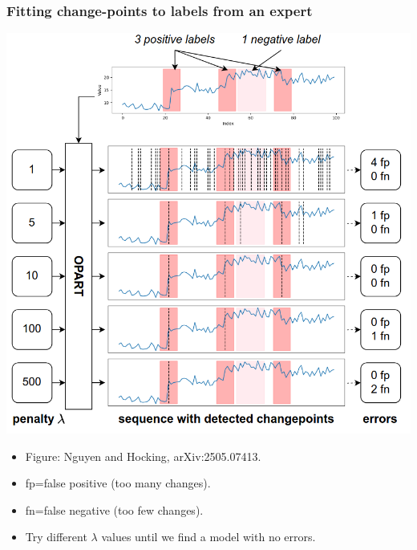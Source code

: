 \documentclass{beamer}
\begin{document}
\begin{frame}
  \frametitle{Fitting change-points to labels from an expert}
\parbox{0.6\textwidth}{
  \includegraphics[width=\linewidth]{supervised-change-label-error}
} \parbox{0.35\textwidth}{
  \begin{itemize}
  \item Figure: Nguyen and Hocking, arXiv:2505.07413.
  \item fp=false positive (too many changes).
  \item fn=false negative (too few changes).
  \item Try different $\lambda$ values until we find a model with no
    errors. 
  \end{itemize}
 }
\end{frame}
\end{document}
